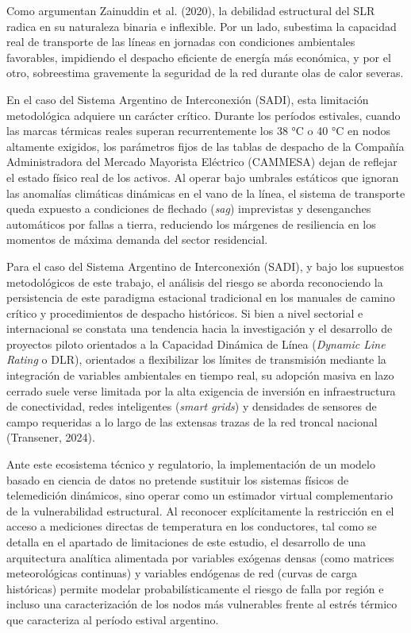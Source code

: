 Como argumentan Zainuddin et al. (2020), la debilidad estructural del SLR radica en su naturaleza binaria e inflexible. Por un lado, subestima la capacidad real de transporte de las líneas en jornadas con condiciones ambientales favorables, impidiendo el despacho eficiente de energía más económica, y por el otro, sobreestima gravemente la seguridad de la red durante olas de calor severas.

En el caso del Sistema Argentino de Interconexión (SADI), esta limitación metodológica adquiere un carácter crítico. Durante los períodos estivales, cuando las marcas térmicas reales superan recurrentemente los 38 °C o 40 °C en nodos altamente exigidos, los parámetros fijos de las tablas de despacho de la Compañía Administradora del Mercado Mayorista Eléctrico (CAMMESA) dejan de reflejar el estado físico real de los activos. Al operar bajo umbrales estáticos que ignoran las anomalías climáticas dinámicas en el vano de la línea, el sistema de transporte queda expuesto a condiciones de flechado (\emph{sag}) imprevistas y desenganches automáticos por fallas a tierra, reduciendo los márgenes de resiliencia en los momentos de máxima demanda del sector residencial.

Para el caso del Sistema Argentino de Interconexión (SADI), y bajo los supuestos metodológicos de este trabajo, el análisis del riesgo se aborda reconociendo la persistencia de este paradigma estacional tradicional en los manuales de camino crítico y procedimientos de despacho históricos. Si bien a nivel sectorial e internacional se constata una tendencia hacia la investigación y el desarrollo de proyectos piloto orientados a la Capacidad Dinámica de Línea (\emph{Dynamic Line Rating} o DLR), orientados a flexibilizar los límites de transmisión mediante la integración de variables ambientales en tiempo real, su adopción masiva en lazo cerrado suele verse limitada por la alta exigencia de inversión en infraestructura de conectividad, redes inteligentes (\emph{smart grids}) y densidades de sensores de campo requeridas a lo largo de las extensas trazas de la red troncal nacional (Transener, 2024).

Ante este ecosistema técnico y regulatorio, la implementación de un modelo basado en ciencia de datos no pretende sustituir los sistemas físicos de telemedición dinámicos, sino operar como un estimador virtual complementario de la vulnerabilidad estructural. Al reconocer explícitamente la restricción en el acceso a mediciones directas de temperatura en los conductores, tal como se detalla en el apartado de limitaciones de este estudio, el desarrollo de una arquitectura analítica alimentada por variables exógenas densas (como matrices meteorológicas continuas) y variables endógenas de red (curvas de carga históricas) permite modelar probabilísticamente el riesgo de falla por región e incluso una caracterización de los nodos más vulnerables frente al estrés térmico que caracteriza al período estival argentino.

